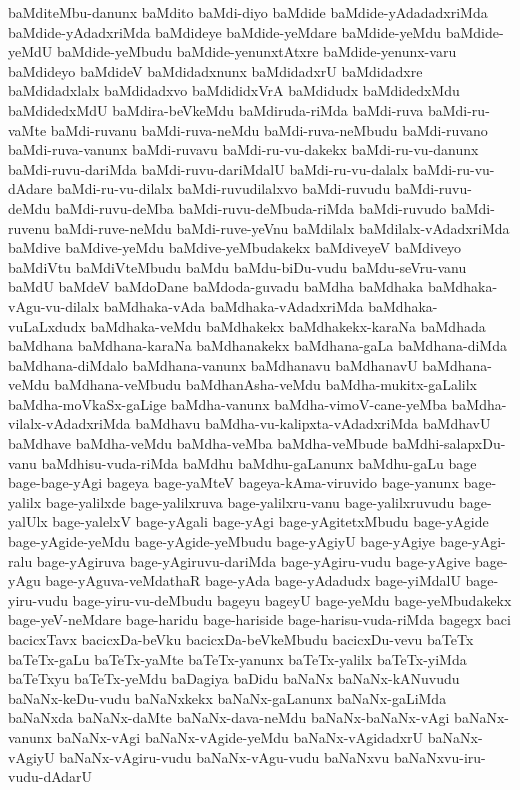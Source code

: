 {baMditeMbu-danunx
baMdito
baMdi-diyo
baMdide
baMdide-yAdadadxriMda
baMdide-yAdadxriMda
baMdideye
baMdide-yeMdare
baMdide-yeMdu
baMdide-yeMdU
baMdide-yeMbudu
baMdide-yenunxtAtxre
baMdide-yenunx-varu
baMdideyo
baMdideV
baMdidadxnunx
baMdidadxrU
baMdidadxre
baMdidadxlalx
baMdidadxvo
baMdididxVrA
baMdidudx
baMdidedxMdu
baMdidedxMdU
baMdira-beVkeMdu
baMdiruda-riMda
baMdi-ruva
baMdi-ru-vaMte
baMdi-ruvanu
baMdi-ruva-neMdu
baMdi-ruva-neMbudu
baMdi-ruvano
baMdi-ruva-vanunx
baMdi-ruvavu
baMdi-ru-vu-dakekx
baMdi-ru-vu-danunx
baMdi-ruvu-dariMda
baMdi-ruvu-dariMdalU
baMdi-ru-vu-dalalx
baMdi-ru-vu-dAdare
baMdi-ru-vu-dilalx
baMdi-ruvudilalxvo
baMdi-ruvudu
baMdi-ruvu-deMdu
baMdi-ruvu-deMba
baMdi-ruvu-deMbuda-riMda
baMdi-ruvudo
baMdi-ruvenu
baMdi-ruve-neMdu
baMdi-ruve-yeVnu
baMdilalx
baMdilalx-vAdadxriMda
baMdive
baMdive-yeMdu
baMdive-yeMbudakekx
baMdiveyeV
baMdiveyo
baMdiVtu
baMdiVteMbudu
baMdu
baMdu-biDu-vudu
baMdu-seVru-vanu
baMdU
baMdeV
baMdoDane
baMdoda-guvadu
baMdha
baMdhaka
baMdhaka-vAgu-vu-dilalx
baMdhaka-vAda
baMdhaka-vAdadxriMda
baMdhaka-vuLaLxdudx
baMdhaka-veMdu
baMdhakekx
baMdhakekx-karaNa
baMdhada
baMdhana
baMdhana-karaNa
baMdhanakekx
baMdhana-gaLa
baMdhana-diMda
baMdhana-diMdalo
baMdhana-vanunx
baMdhanavu
baMdhanavU
baMdhana-veMdu
baMdhana-veMbudu
baMdhanAsha-veMdu
baMdha-mukitx-gaLalilx
baMdha-moVkaSx-gaLige
baMdha-vanunx
baMdha-vimoV-cane-yeMba
baMdha-vilalx-vAdadxriMda
baMdhavu
baMdha-vu-kalipxta-vAdadxriMda
baMdhavU
baMdhave
baMdha-veMdu
baMdha-veMba
baMdha-veMbude
baMdhi-salapxDu-vanu
baMdhisu-vuda-riMda
baMdhu
baMdhu-gaLanunx
baMdhu-gaLu
bage
bage-bage-yAgi
bageya
bage-yaMteV
bageya-kAma-viruvido
bage-yanunx
bage-yalilx
bage-yalilxde
bage-yalilxruva
bage-yalilxru-vanu
bage-yalilxruvudu
bage-yalUlx
bage-yalelxV
bage-yAgali
bage-yAgi
bage-yAgitetxMbudu
bage-yAgide
bage-yAgide-yeMdu
bage-yAgide-yeMbudu
bage-yAgiyU
bage-yAgiye
bage-yAgi-ralu
bage-yAgiruva
bage-yAgiruvu-dariMda
bage-yAgiru-vudu
bage-yAgive
bage-yAgu
bage-yAguva-veMdathaR
bage-yAda
bage-yAdadudx
bage-yiMdalU
bage-yiru-vudu
bage-yiru-vu-deMbudu
bageyu
bageyU
bage-yeMdu
bage-yeMbudakekx
bage-yeV-neMdare
bage-haridu
bage-hariside
bage-harisu-vuda-riMda
bagegx
baci
bacicxTavx
bacicxDa-beVku
bacicxDa-beVkeMbudu
bacicxDu-vevu
baTeTx
baTeTx-gaLu
baTeTx-yaMte
baTeTx-yanunx
baTeTx-yalilx
baTeTx-yiMda
baTeTxyu
baTeTx-yeMdu
baDagiya
baDidu
baNaNx
baNaNx-kANuvudu
baNaNx-keDu-vudu
baNaNxkekx
baNaNx-gaLanunx
baNaNx-gaLiMda
baNaNxda
baNaNx-daMte
baNaNx-dava-neMdu
baNaNx-baNaNx-vAgi
baNaNx-vanunx
baNaNx-vAgi
baNaNx-vAgide-yeMdu
baNaNx-vAgidadxrU
baNaNx-vAgiyU
baNaNx-vAgiru-vudu
baNaNx-vAgu-vudu
baNaNxvu
baNaNxvu-iru-vudu-dAdarU
}
